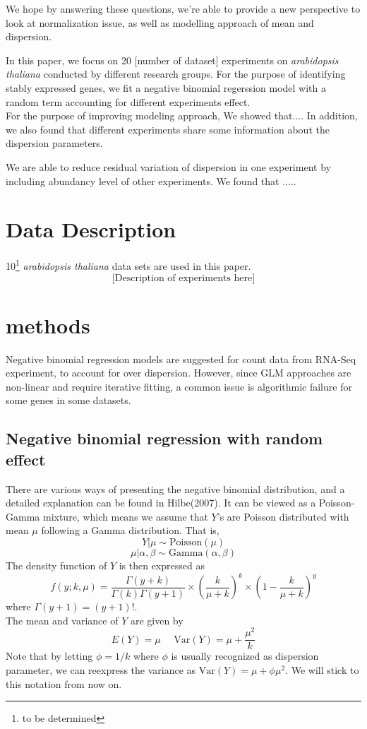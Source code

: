 \documentclass[paper=a4, fontsize=12.5pt]{scrartcl} %
\numberwithin{equation}{section} %
\numberwithin{figure}{section} %
\numberwithin{table}{section} %
\begin{document}
 
 
  We hope by answering these questions, we're able to provide a new perspective to look at normalization issue, as well as modelling approach of mean and dispersion.






In this paper, we focus on 20 [number of dataset] experiments on \textit{arabidopsis thaliana} conducted by different research groups. For the purpose of identifying stably expressed genes, we fit a negative binomial regerssion model with a random term accounting for different experiments effect. \\
For the purpose of improving modeling approach, 
We showed that.... In addition, we also found that different experiments share some information about the dispersion parameters. 

We are able to reduce residual variation of dispersion in one experiment by including abundancy level of other experiments. We found that .....

\section{Data Description}
10\footnote{to be determined} \textit{arabidopsis thaliana} data sets are used in this paper. 
\[\text{[Description of experiments here]}\]

\section{methods}
Negative binomial regression models are suggested for count data from RNA-Seq experiment{\color{green}{[Reference]}}, to account for over dispersion. However, since  GLM approaches are non-linear and require iterative fitting, a common issue is algorithmic failure for some genes in some datasets. \\

\subsection{Negative binomial regression with random effect}
There are various ways of presenting the negative binomial distribution, and a detailed explanation can be found in Hilbe(2007). It can be viewed as a Poisson-Gamma mixture, which means we assume that $Y$'s are Poisson distributed with mean $\mu$ following a Gamma distribution. That is,
\[Y|\mu \sim \text{Poisson}(\mu)\]
\[\mu|\alpha, \beta \sim \text{Gamma}(\alpha, \beta)\]
 The density function of $Y$ is then expressed as
\[f(y; k,\mu)=\frac{\Gamma(y+ k)}{\Gamma(k)\Gamma(y + 1)}\times \left(\frac{k}{\mu + k }\right)^k\times\left(1- \frac{k}{\mu + k }\right)^y\]
where $\Gamma(y+1)=(y+1)!$.\\ The mean and variance of $Y$ are given by
\[E(Y)= \mu  ~~~~~~\text{Var}(Y)=\mu + \frac{\mu^2}{k}\]
Note that by letting $\phi= 1/k$ where $\phi$ is usually recognized as dispersion parameter,  we can reexpress the variance as $\text{Var}(Y)= \mu + \phi\mu^2$. We will stick to this notation from now on.
\end{document}
